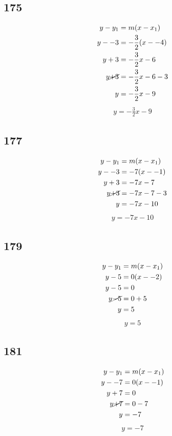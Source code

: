 \documentclass{article}
\begin{document}
    \subsection*{175}
    \begin{align*}
        y - y_{1} &= m(x - x_{1})\\
        y - -3 &= -\frac{3}{2}(x - -4) \\
        y + 3 &= -\frac{3}{2}x - 6\\
        y \cancel{+3} &= -\frac{3}{2}x - 6 -3\\
        y &= -\frac{3}{2}x -9
    \end{align*}
    \begin{align*}
        \boxed{y = -\frac{3}{2}x -9}
    \end{align*}

    \subsection*{177}
    \begin{align*}
        y - y_{1} &= m(x - x_{1})\\
        y - -3 &= -7(x - -1) \\
        y + 3 &= -7x - 7\\
        y \cancel{+3} &= -7x - 7 -3\\
        y &= -7x - 10
    \end{align*}
    \begin{align*}
        \boxed{y = -7x - 10}
    \end{align*}

    \subsection*{179}
    \begin{align*}
        y - y_{1} &= m(x - x_{1})\\
        y - 5 &= 0(x - -2) \\
        y -5 &= 0\\
        y \cancel{-5} &= 0 +5\\
        y &= 5
    \end{align*}
    \begin{align*}
        \boxed{y = 5}
    \end{align*}

    \subsection*{181}
    \begin{align*}
        y - y_{1} &= m(x - x_{1})\\
        y - -7 &= 0(x - -1) \\
        y +7  &= 0\\
        y \cancel{+7} &= 0 -7\\
        y &= -7
    \end{align*}
    \begin{align*}
        \boxed{y = -7}
    \end{align*}
\end{document}
